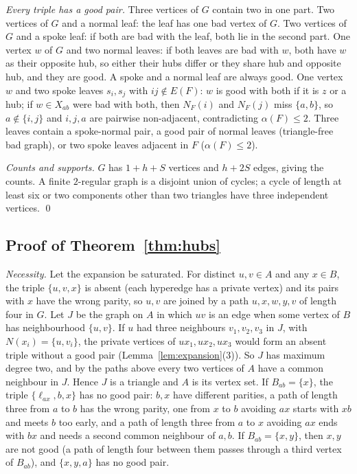 \documentclass[11pt]{article}
\theoremstyle{remark}
\begin{document}
\emph{Every triple has a good pair.} Three vertices of $G$ contain two in
one part. Two vertices of $G$ and a normal leaf: the leaf has one bad
vertex of $G$. Two vertices of $G$ and a spoke leaf: if both are bad with
the leaf, both lie in the second part. One vertex $w$ of $G$ and two
normal leaves: if both leaves are bad with $w$, both have $w$ as their
opposite hub, so either their hubs differ or they share hub and opposite
hub, and they are good. A spoke and a normal leaf are always good. One
vertex $w$ and two spoke leaves $s_i,s_j$ with $ij\notin E(F)$: $w$ is good
with both if it is $z$ or a hub; if $w\in X_{ab}$ were bad with both, then
$N_F(i)$ and $N_F(j)$ miss $\{a,b\}$, so $a\notin\{i,j\}$ and $i,j,a$ are
pairwise non-adjacent, contradicting $\alpha(F)\le2$. Three leaves
contain a spoke-normal pair, a good pair of normal leaves (triangle-free
bad graph), or two spoke leaves adjacent in $F$ ($\alpha(F)\le2$).

\emph{Counts and supports.} $G$ has $1+h+S$ vertices and $h+2S$ edges,
giving the counts. A finite $2$-regular graph is a disjoint union of
cycles; a cycle of length at least six or two components other than two
triangles have three independent vertices. \qed

\subsection{Proof of Theorem~\ref{thm:hubs}}

\emph{Necessity.} Let the expansion be saturated. For distinct $u,v\in A$
and any $x\in B$, the triple $\{u,v,x\}$ is absent (each hyperedge has a
private vertex) and its pairs with $x$ have the wrong parity, so $u,v$
are joined by a path $u,x,w,y,v$ of length four in $G$. Let $J$ be the
graph on $A$ in which $uv$ is an edge when some vertex of $B$ has
neighbourhood $\{u,v\}$. If $u$ had three neighbours $v_1,v_2,v_3$ in $J$,
with $N(x_i)=\{u,v_i\}$, the private vertices of $ux_1,ux_2,ux_3$ would
form an absent triple without a good pair (Lemma~\ref{lem:expansion}(3)).
So $J$ has maximum degree two, and by the paths above every two vertices
of $A$ have a common neighbour in $J$. Hence $J$ is a triangle and $A$ is
its vertex set. If $B_{ab}=\{x\}$, the triple $\{\ell_{ax},b,x\}$ has no
good pair: $b,x$ have different parities, a path of length three from $a$
to $b$ has the wrong parity, one from $x$ to $b$ avoiding $ax$ starts with
$xb$ and meets $b$ too early, and a path of length three from $a$
to $x$ avoiding $ax$ ends with $bx$ and needs a second common neighbour of
$a,b$. If $B_{ab}=\{x,y\}$, then $x,y$ are not good (a path of length four
between them passes through a third vertex of $B_{ab}$), and $\{x,y,a\}$
has no good pair.
\end{document}

